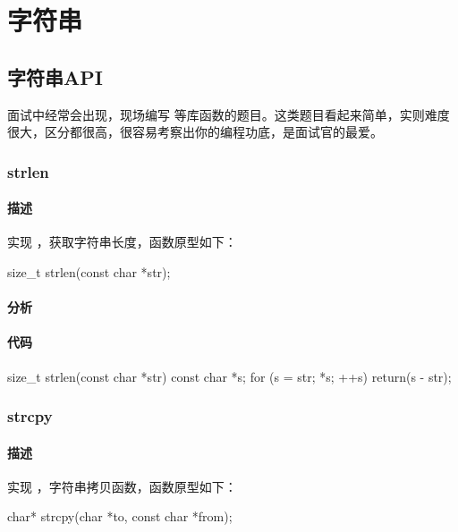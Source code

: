 \chapter{字符串}


\section{字符串API} %
面试中经常会出现，现场编写  等库函数的题目。这类题目看起来简单，实则难度很大，区分都很高，很容易考察出你的编程功底，是面试官的最爱。


\subsection{strlen}


\subsubsection{描述}
实现 ，获取字符串长度，函数原型如下：
\begin{Code}
size_t strlen(const char *str);
\end{Code}


\subsubsection{分析}



\subsubsection{代码}
\begin{Code}
size_t strlen(const char *str) {
    const char *s;
    for (s = str; *s; ++s) {}
    return(s - str);
}
\end{Code}


\subsection{strcpy}


\subsubsection{描述}
实现 ，字符串拷贝函数，函数原型如下：
\begin{Code}
char* strcpy(char *to, const char *from);
\end{Code}


